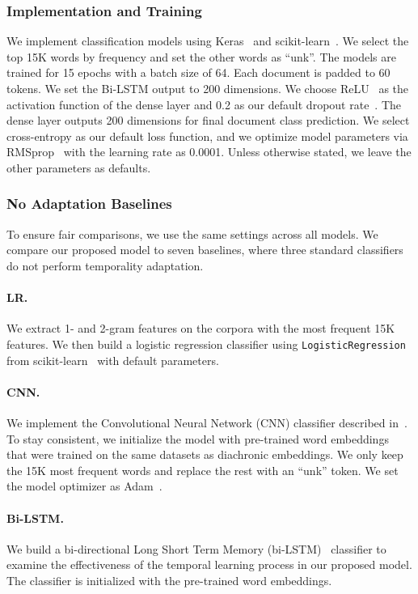 \subsubsection{Implementation and Training}
We implement classification models using Keras~\cite{chollet2015keras} and scikit-learn~\cite{pedregosa2011scikit}. We select the top 15K words by frequency and set the other words as ``unk''. The models are trained for 15 epochs with a batch size of 64. Each document is padded to 60 tokens. We set the Bi-LSTM output to 200 dimensions. We choose ReLU~\cite{hahnloser2000digital} as the activation function of the dense layer and 0.2 as our default dropout rate~\cite{srivastava2014dropout}. The dense layer outputs 200 dimensions for final document class prediction. We select cross-entropy as our default loss function, and we optimize model parameters via RMSprop~\cite{tieleman2012lecture} with the learning rate as 0.0001. Unless otherwise stated, we leave the other parameters as defaults.

\subsubsection{No Adaptation Baselines}
To ensure fair comparisons, we use the same settings across all models. We compare our proposed model to seven baselines, where three standard classifiers do not perform temporality adaptation.

\paragraph{LR.} 
We extract 1- and 2-gram features on the corpora with the most frequent 15K features. We then build a logistic regression classifier using \texttt{LogisticRegression} from scikit-learn~\cite{pedregosa2011scikit} with default parameters.

\paragraph{CNN.} 
We implement the Convolutional Neural Network (CNN) classifier described in~\cite{kim2014convolutional}. To stay consistent, we initialize the model with pre-trained word embeddings~\cite{bojanowski2017enriching} that were trained on the same datasets as diachronic embeddings. We only keep the 15K most frequent words and replace the rest with an ``unk'' token. 
We set the model optimizer as Adam~\cite{kingma2014adam}. 

\paragraph{Bi-LSTM.} 
We build a bi-directional Long Short Term Memory (bi-LSTM)~\cite{hochreiter1997long} classifier to examine the effectiveness of the temporal learning process in our proposed model. The classifier is initialized with the pre-trained word embeddings.

